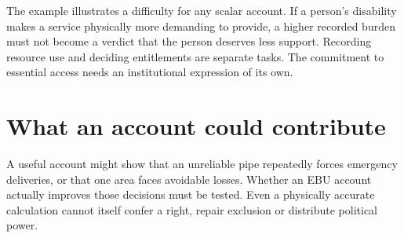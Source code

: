 The example illustrates a difficulty for any scalar account. If a person's disability makes a service physically more demanding to provide, a higher recorded burden must not become a verdict that the person deserves less support. Recording resource use and deciding entitlements are separate tasks. The commitment to essential access needs an institutional expression of its own.

\section{What an account could contribute}
A useful account might show that an unreliable pipe repeatedly forces emergency deliveries, or that one area faces avoidable losses. Whether an EBU account actually improves those decisions must be tested. Even a physically accurate calculation cannot itself confer a right, repair exclusion or distribute political power.


